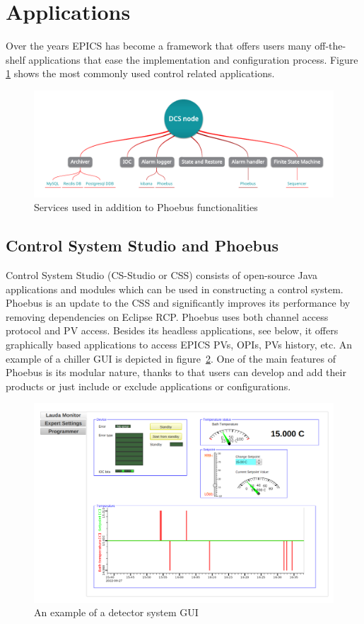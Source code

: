 \section{Applications}
Over the years EPICS has become a framework that offers users many off-the-shelf applications that ease the implementation and configuration process. Figure \ref{fig_dcs_node_msts} shows the most commonly used control related applications. 

\begin{figure}[!h]
\centering
\includegraphics[width=0.9\columnwidth]{Chapter4/images/dcs_node.png}
\caption{Services used in addition to Phoebus functionalities}
\label{fig_dcs_node_msts}
\end{figure}
\subsection{Control System Studio and Phoebus}
Control System Studio (CS-Studio or CSS) consists of open-source Java applications and modules which can be used in constructing a control system. Phoebus is an update to the \gls{CSS} and significantly improves its performance by removing dependencies on Eclipse RCP. Phoebus uses both channel access protocol and PV access. Besides its headless applications, see below, it offers graphically based applications to access EPICS PVs, OPIs, PVs history, etc. An example of a chiller GUI is depicted in figure~\ref{fig_lauda1}. One of the main features of Phoebus is its modular nature, thanks to that users can develop and add their products or just include or exclude applications or configurations. 


\begin{figure}[!h]
\centering
\includegraphics[width=0.75\columnwidth]{Chapter4/images/lauda1.png}
\caption{An example of a detector system \gls{GUI}}
\label{fig_lauda1}
\end{figure}

